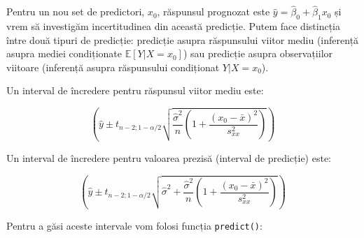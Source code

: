 \documentclass[]{article}
\begin{document}
Pentru un nou set de predictori, \(x_0\), răspunsul prognozat este
\(\hat{y} = \hat{\beta}_0+\hat{\beta}_1 x_0\) și vrem să investigăm
incertitudinea din această predicție. Putem face distincția între două
tipuri de predicție: predicție asupra răspunsului viitor mediu
(inferență asupra mediei condiționate \(\mathbb{E}[Y|X=x_0]\)) sau
predicție asupra observațiilor viitoare (inferență asupra răspunsului
condiționat \(Y|X=x_0\)).

Un interval de încredere pentru răspunsul viitor mediu este:

\[
\left(\hat y \pm t_{n-2;1-\alpha/2}\sqrt{\frac{\hat\sigma^2}{n}\left(1+\frac{(x_0-\bar x)^2}{s_{xx}^2}\right)}\right)
\]

Un interval de încredere pentru valoarea prezisă (interval de predicție)
este:

\[
\left(\hat y \pm t_{n-2;1-\alpha/2}\sqrt{\hat\sigma^2+\frac{\hat\sigma^2}{n}\left(1+\frac{(x_0-\bar x)^2}{s_{xx}^2}\right)}\right)
\]

Pentru a găsi aceste intervale vom folosi funcția \texttt{predict()}:
\end{document}
